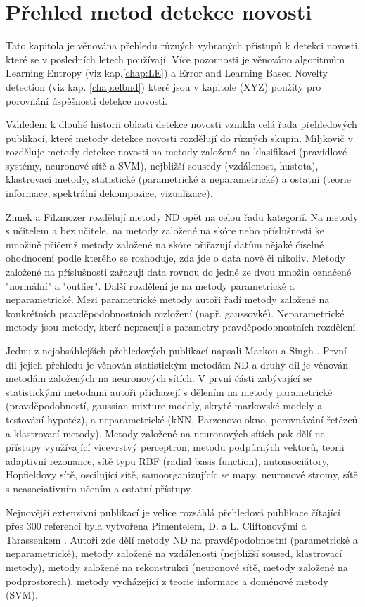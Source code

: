\chapter{Přehled metod detekce novosti}
Tato kapitola je věnována přehledu různých vybraných přístupů k detekci novosti, které se v posledních letech používají. Více pozornosti je věnováno algoritmům Learning Entropy (viz kap.\ref{chap:LE}) a Error and Learning Based Novelty detection (viz kap. \ref{chap:elbnd}) které jsou v kapitole (XYZ) použity pro porovnání úspěšnosti detekce novosti.
\par
Vzhledem k dlouhé historii oblasti detekce novosti vznikla celá řada přehledových publikací, které metody detekce novosti rozdělují do různých skupin. Miljkovič v \cite{miljkovic} rozděluje metody detekce novosti na metody založené na klasifikaci (pravidlové systémy, neuronové sítě a SVM), nejbližší sousedy (vzdálenost, hustota), klastrovací metody, statistické (parametrické a neparametrické) a ostatní (teorie informace, spektrální dekompozice, vizualizace).
\par 
Zimek a Filzmozer \cite{zimek} rozdělují metody ND opět na celou řadu kategorií. Na metody s učitelem a bez učitele, na metody založené na skóre nebo příslušnosti ke množině přičemž metody založené na skóre přiřazují datům nějaké číselné ohodnocení podle kterého se rozhoduje, zda jde o data nové či nikoliv. Metody založené na příslušnosti zařazují data rovnou do jedné ze dvou množin označené "normální" a "outlier". Další rozdělení je na metody parametrické a neparametrické. Mezi parametrické metody autoři řadí metody založené na konkrétních pravděpodobnostních rozložení (např. gaussovké). Neparametrické metody jsou metody, které nepracují s parametry pravděpodobnostních rozdělení. 
\par 
Jednu z nejobsáhlejších přehledových publikací napsali Markou a Singh \cite{markou1,markou2}. První díl jejich přehledu je věnován statistickým metodám ND a druhý díl je věnován metodám založených na neuronových sítích. V první části zabývající se statistickými metodami autoři přichazejí s dělením na metody parametrické (pravděpodobností, gaussian mixture modely, skryté markovské modely a testování hypotéz), a neparametrické (kNN, Parzenovo okno, porovnávání řetězců a klastrovací metody). Metody založené na neuronových sítích pak dělí ne přístupy využívající vícevrstvý perceptron, metodu podpůrných vektorů, teorii adaptivní rezonance, sítě typu RBF (radial basis function), autoasociátory, Hopfieldovy sítě, oscilující sítě, samoorganizujícíc se mapy, neuronové stromy, sítě s neasociativním učením a ostatní přístupy.
\par
Nejnovější extenzivní publikací je velice rozsáhlá přehledová publikace čítající přes 300 referencí byla vytvořena Pimentelem, D. a L. Cliftonovými a Tarassenkem \cite{pimentel}. Autoři zde dělí metody ND na pravděpodobnostní (parametrické a neparametrické), metody založené na vzdálenosti (nejbližší soused, klastrovací metody), metody založené na rekonstrukci (neuronové sítě, metody založené na podprostorech), metody vycházející z teorie informace a doménové metody (SVM).
